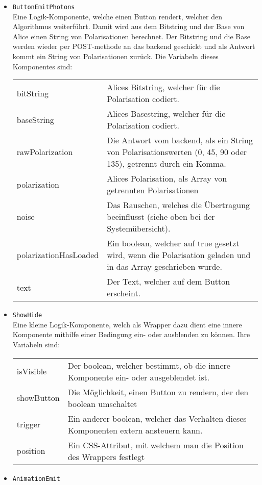 \documentclass[a4paper,10.2pt,pdftex]{scrartcl}%
\begin{document}
\begin{itemize}
\begin{tabularx}{\textwidth}{p{3cm}p{11cm}}
\end{tabularx}
\item \texttt{ButtonEmitPhotons} \\
Eine Logik-Komponente, welche einen Button rendert, welcher den Algorithmus weiterführt. Damit wird aus dem Bitstring und der Base von Alice einen String von Polarisationen berechnet. Der Bitstring und die Base werden wieder per POST-methode an das backend geschickt und als Antwort kommt ein String von Polarisationen zurück.
Die Variabeln dieses Komponentes sind:
\begin{tabularx}{\textwidth}{p{3cm}p{11cm}} 
bitString & Alices Bitstring, welcher für die Polarisation codiert. \\
baseString & Alices Basestring, welcher für die Polarisation codiert. \\
rawPolarization & Die Antwort vom backend, als ein String von Polarisationswerten (0, 45, 90 oder 135), getrennt durch ein Komma. \\
polarization & Alices Polarisation, als Array von getrennten Polarisationen \\
noise &  Das Rauschen, welches die Übertragung beeinflusst (siehe oben bei der Systemübersicht). \\
polarizationHasLoaded & Ein boolean, welcher auf true gesetzt wird, wenn die Polarisation geladen und in das Array geschrieben wurde. \\
text & Der Text, welcher auf dem Button erscheint.
\end{tabularx}
\item \texttt{ShowHide} \\
Eine kleine Logik-Komponente, welch als Wrapper dazu dient eine innere Komponente mithilfe einer Bedingung ein- oder ausblenden zu können. Ihre Variabeln sind: \\[3mm]
\begin{tabularx}{\textwidth}{p{3cm}p{11cm}} 
isVisible & Der boolean, welcher bestimmt, ob die innere Komponente ein- oder ausgeblendet ist. \\
showButton & Die Möglichkeit, einen Button zu rendern, der den boolean umschaltet \\
trigger & Ein anderer boolean, welcher das Verhalten dieses Komponenten extern ansteuern kann. \\
position & Ein CSS-Attribut, mit welchem man die Position des Wrappers festlegt
\end{tabularx}
\item \texttt{AnimationEmit} \\

\end{itemize}
\end{document}
